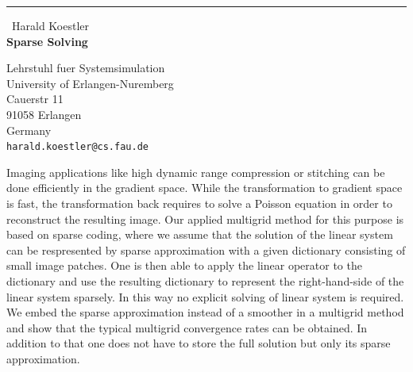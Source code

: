 \documentclass{report}
\begin{document}
\begin{center}
\rule{6in}{1pt} \
{\large Harald Koestler \\
{\bf Sparse Solving}}

Lehrstuhl fuer Systemsimulation \\ University of Erlangen-Nuremberg \\ Cauerstr 11 \\ 91058 Erlangen \\ Germany
\\
{\tt harald.koestler@cs.fau.de}\end{center}

Imaging applications like high dynamic range compression or stitching can
be done efficiently in the gradient space.
While the transformation to gradient space is fast, the
transformation back requires to solve a Poisson equation in order to
reconstruct the resulting image.
Our applied multigrid method for this purpose is based on sparse coding,
where we assume that the solution of the linear system can be
respresented by sparse approximation with a given dictionary consisting
of small image patches.
One is then able to apply the linear operator to the dictionary and use
the resulting dictionary to represent the right-hand-side of the linear
system sparsely.
In this way no explicit solving of linear system is required.
We embed the sparse approximation instead of a smoother in a multigrid
method and show that the typical multigrid convergence rates can be
obtained.
In addition to that one does not have to store the full solution but only
its sparse approximation.
\end{document}
